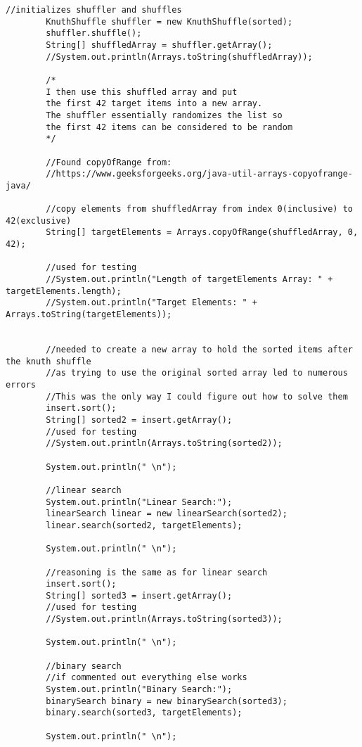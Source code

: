 \documentclass[10pt]{article}
\begin{document}
\begin{lstlisting}[frame=single, ]
        //initializes shuffler and shuffles
        KnuthShuffle shuffler = new KnuthShuffle(sorted);
        shuffler.shuffle();
        String[] shuffledArray = shuffler.getArray();
        //System.out.println(Arrays.toString(shuffledArray));

        /*  
        I then use this shuffled array and put
        the first 42 target items into a new array.
        The shuffler essentially randomizes the list so 
        the first 42 items can be considered to be random
        */

        //Found copyOfRange from:
        //https://www.geeksforgeeks.org/java-util-arrays-copyofrange-java/

        //copy elements from shuffledArray from index 0(inclusive) to 42(exclusive)
        String[] targetElements = Arrays.copyOfRange(shuffledArray, 0, 42);

        //used for testing
        //System.out.println("Length of targetElements Array: " + targetElements.length);
        //System.out.println("Target Elements: " + Arrays.toString(targetElements));


        //needed to create a new array to hold the sorted items after the knuth shuffle 
        //as trying to use the original sorted array led to numerous errors
        //This was the only way I could figure out how to solve them
        insert.sort();
        String[] sorted2 = insert.getArray();
        //used for testing
        //System.out.println(Arrays.toString(sorted2));

        System.out.println(" \n");

        //linear search
        System.out.println("Linear Search:");
        linearSearch linear = new linearSearch(sorted2);
        linear.search(sorted2, targetElements);

        System.out.println(" \n");

        //reasoning is the same as for linear search
        insert.sort();
        String[] sorted3 = insert.getArray();
        //used for testing
        //System.out.println(Arrays.toString(sorted3));

        System.out.println(" \n");

        //binary search
        //if commented out everything else works
        System.out.println("Binary Search:");
        binarySearch binary = new binarySearch(sorted3);
        binary.search(sorted3, targetElements);

        System.out.println(" \n");


\end{lstlisting}
\end{document}
